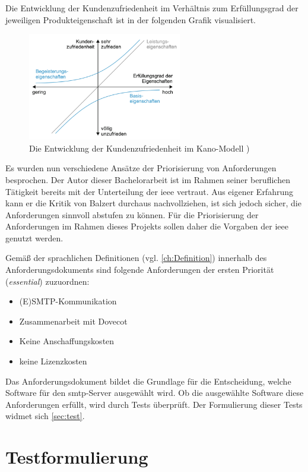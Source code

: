 Die Entwicklung der Kundenzufriedenheit im Verhältnis zum Erfüllungsgrad der jeweiligen Produkteigenschaft ist in der folgenden Grafik visualisiert.

\begin{figure}[H]
  \centering
  \includegraphics[width=0.6\textwidth]{res/kano.png}
  \caption{Die Entwicklung der Kundenzufriedenheit im Kano-Modell \citep[][545]{Balzert2010})}
  \label{fig:Kanomodell}
\end{figure}

Es wurden nun verschiedene Ansätze der Priorisierung von Anforderungen besprochen. Der Autor dieser Bachelorarbeit ist im Rahmen seiner beruflichen Tätigkeit bereits mit der Unterteilung der \ac{ieee} vertraut. Aus eigener Erfahrung kann er die Kritik von Balzert durchaus nachvollziehen, ist sich jedoch sicher, die Anforderungen sinnvoll abstufen zu können. Für die Priorisierung der Anforderungen im Rahmen dieses Projekts sollen daher die Vorgaben der \ac{ieee} genutzt werden.

Gemäß der sprachlichen Definitionen (vgl. \autoref{ch:Definition}) innerhalb des Anforderungsdokuments sind folgende Anforderungen der ersten Priorität (\textit{essential}) zuzuordnen:
\begin{itemize}
	\item (E)SMTP-Kommunikation
	\item Zusammenarbeit mit Dovecot
	\item Keine Anschaffungskosten
	\item keine Lizenzkosten
\end{itemize}

Das Anforderungsdokument bildet die Grundlage für die Entscheidung, welche Software für den \ac{smtp}-Server ausgewählt wird. Ob die ausgewählte Software diese Anforderungen erfüllt, wird durch Tests überprüft. Der Formulierung dieser Tests widmet sich \autoref{sec:test}.

\section{Testformulierung}
\label{sec:test}

